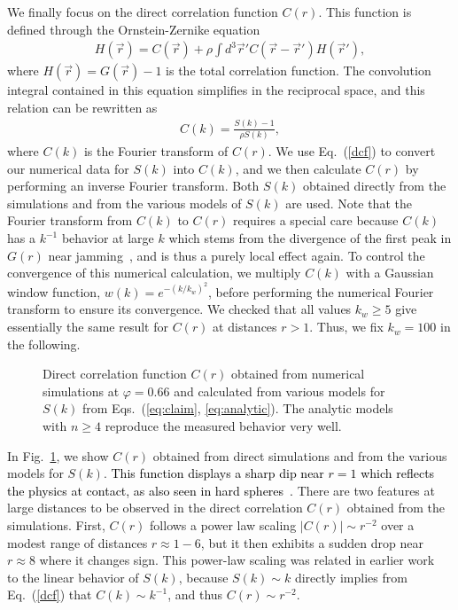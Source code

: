 \documentclass[aps,pre,twocolumn,superscriptaddress]{revtex4-1}
\renewcommand{\phi}{\varphi}
\newcommand{\red}[1]{\textcolor{black}{#1}}
\begin{document}
We finally focus on the direct correlation function $C(r)$.
This function is defined through the Ornstein-Zernike equation~\cite{hansen} 
\begin{eqnarray}
H(\vec{r}) = C(\vec{r}) + \rho \int d^3\vec{r}' C(\vec{r} - 
\vec{r}') H (\vec{r}'), 
\end{eqnarray}
where $H(\vec{r}) = G(\vec{r}) - 1$ is the total correlation function. 
The convolution integral contained in this equation
simplifies in the reciprocal space, and this relation 
can be rewritten as 
\begin{eqnarray}
C(k) = \frac{S(k) - 1}{\rho S(k)}, \label{dcf}
\end{eqnarray}
where $C(k)$ is the Fourier transform of $C(r)$. 
We use Eq.~(\ref{dcf}) to convert our numerical data for 
$S(k)$ into $C(k)$, 
and we then calculate $C(r)$ by performing an inverse 
Fourier transform. 
Both $S(k)$ obtained directly from the simulations 
and from the various models of $S(k)$ are used. 
Note that the Fourier transform from $C(k)$ to $C(r)$ 
requires a special care because $C(k)$ has a $k^{-1}$ 
behavior at large $k$ which stems from the divergence of 
the first peak in $G(r)$ near jamming~\cite{ohern2003,ikeda2013a}, 
and is thus a purely local effect again. To control the convergence of
this numerical calculation, 
we multiply $C(k)$ with a Gaussian window function, $w(k) = e^{- (k/k_w)^2}$,
before performing the numerical Fourier transform to ensure its convergence. 
We checked that all values $k_w \geq 5$ give essentially the same 
result for $C(r)$ at distances $r > 1$. Thus, we 
fix $k_w = 100$ in the following. 

\begin{figure}
\begin{center}
\caption{Direct correlation function $C(r)$
obtained from numerical simulations at $\phi=0.66$
and calculated from various models for $S(k)$ from 
Eqs.~(\ref{eq:claim}, \ref{eq:analytic}). The analytic models 
with $n \geq 4$ reproduce the measured behavior very well.}
\label{fig:cr}
\end{center}
\end{figure}

In Fig.~\ref{fig:cr}, we show $C(r)$ obtained from 
direct simulations and from the various models for $S(k)$. 
\red{This function displays a sharp dip near $r=1$
which reflects the physics at contact, as also seen in 
hard spheres~\cite{atkinson2016}.}  
There are two features at large distances to be observed 
in the direct correlation $C(r)$ obtained from the 
simulations. First, $C(r)$ follows a power law scaling 
$|C(r)| \sim r^{-2}$ over a modest range of distances  $r \approx 1-6$, 
but it then exhibits a sudden drop near $r \approx 8$ where it changes sign.
This power-law scaling was related 
in earlier work~\cite{atkinson2016} to the linear behavior of $S(k)$, 
because $S(k) \sim k$ directly implies 
from Eq.~(\ref{dcf}) that $C(k) \sim k^{-1}$, and thus $C(r) \sim r^{-2}$. 
\end{document}
